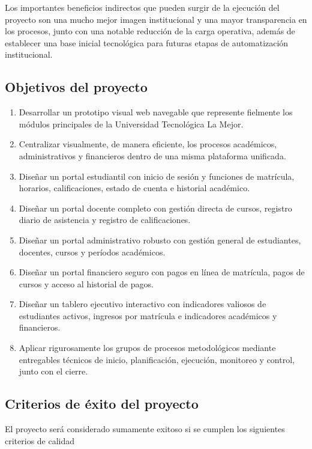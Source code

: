\documentclass[11pt,spanish]{article}
\begin{document}
Los importantes beneficios indirectos que pueden surgir de la ejecución del proyecto son una mucho mejor imagen institucional y una mayor transparencia en los procesos, junto con una notable reducción de la carga operativa, además de establecer una base inicial tecnológica para futuras etapas de automatización institucional.

\subsection{Objetivos del proyecto}

\begin{enumerate}
    \item Desarrollar un prototipo visual web navegable que represente fielmente los módulos principales de la Universidad Tecnológica La Mejor.
    \item Centralizar visualmente, de manera eficiente, los procesos académicos, administrativos y financieros dentro de una misma plataforma unificada.
    \item Diseñar un portal estudiantil con inicio de sesión y funciones de matrícula, horarios, calificaciones, estado de cuenta e historial académico.
    \item Diseñar un portal docente completo con gestión directa de cursos, registro diario de asistencia y registro de calificaciones.
    \item Diseñar un portal administrativo robusto con gestión general de estudiantes, docentes, cursos y períodos académicos.
    \item Diseñar un portal financiero seguro con pagos en línea de matrícula, pagos de cursos y acceso al historial de pagos.
    \item Diseñar un tablero ejecutivo interactivo con indicadores valiosos de estudiantes activos, ingresos por matrícula e indicadores académicos y financieros.
    \item Aplicar rigurosamente los grupos de procesos metodológicos mediante entregables técnicos de inicio, planificación, ejecución, monitoreo y control, junto con el cierre.
\end{enumerate}

\subsection{Criterios de éxito del proyecto}

El proyecto será considerado sumamente exitoso si se cumplen los siguientes criterios de calidad
\end{document}
